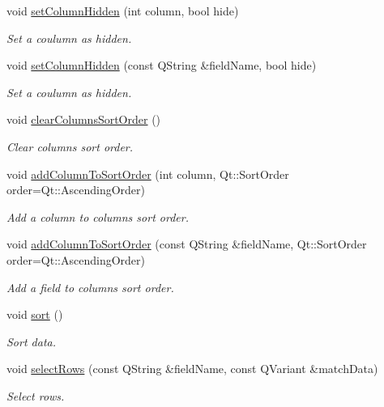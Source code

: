 \begin{DoxyCompactItemize}
void \hyperlink{classmdt_sql_selection_dialog_a8b7f8d24a959533ebe434443f19920c7}{set\-Column\-Hidden} (int column, bool hide)
\begin{DoxyCompactList}\small\item\em Set a coulumn as hidden. \end{DoxyCompactList}\item 
void \hyperlink{classmdt_sql_selection_dialog_a163280676920829583a4888b742fc96c}{set\-Column\-Hidden} (const Q\-String \&field\-Name, bool hide)
\begin{DoxyCompactList}\small\item\em Set a coulumn as hidden. \end{DoxyCompactList}\item 
void \hyperlink{classmdt_sql_selection_dialog_a82df70e51cdc408dfbb9cd1047392403}{clear\-Columns\-Sort\-Order} ()
\begin{DoxyCompactList}\small\item\em Clear columns sort order. \end{DoxyCompactList}\item 
void \hyperlink{classmdt_sql_selection_dialog_a9fe80365b3e41f88b0879fc098b8f6c0}{add\-Column\-To\-Sort\-Order} (int column, Qt\-::\-Sort\-Order order=Qt\-::\-Ascending\-Order)
\begin{DoxyCompactList}\small\item\em Add a column to columns sort order. \end{DoxyCompactList}\item 
void \hyperlink{classmdt_sql_selection_dialog_a594df719c71d852e9ca318d729ec14d3}{add\-Column\-To\-Sort\-Order} (const Q\-String \&field\-Name, Qt\-::\-Sort\-Order order=Qt\-::\-Ascending\-Order)
\begin{DoxyCompactList}\small\item\em Add a field to columns sort order. \end{DoxyCompactList}\item 
void \hyperlink{classmdt_sql_selection_dialog_a34941e9927a0af3a2c052356da2d36bd}{sort} ()
\begin{DoxyCompactList}\small\item\em Sort data. \end{DoxyCompactList}\item 
void \hyperlink{classmdt_sql_selection_dialog_ad28449f5ab1b3ad4fdbdf3f5a0fbb456}{select\-Rows} (const Q\-String \&field\-Name, const Q\-Variant \&match\-Data)
\begin{DoxyCompactList}\small\item\em Select rows. \end{DoxyCompactList}\item 

\end{DoxyCompactItemize}
